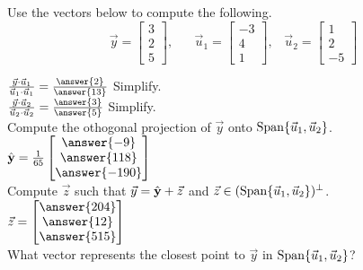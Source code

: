 \documentclass{ximera}
\newcommand{\Span}{\mathop{\rm Span}}
\begin{document}
  	  		             \begin{question} 
  	  		             	Use the vectors below to compute the following. 
  	  		             	$$\vec{y} = \begin{bmatrix} 3\\2\\5\end{bmatrix}, \hspace{20pt} \vec{u}_1 = \begin{bmatrix} -3\\4\\1\end{bmatrix}, \hspace{10pt} \vec{u}_2 = \begin{bmatrix} 1\\2\\-5\end{bmatrix}$$
  	  		             	
  	  		             $\frac{\vec{y}\cdot\vec{u}_1}{\vec{u}_1\cdot\vec{u}_1} =\frac{\answer{2}}{\answer{13}}$ Simplify.\vspace{10pt}\\
  	  		              $\frac{\vec{y}\cdot\vec{u}_2}{\vec{u}_2\cdot\vec{u}_2} =\frac{\answer{3}}{\answer{5}} $ Simplify. \vspace{10pt}\\
  	  		              Compute the othogonal projection of $\vec{y}$ onto $\Span\{\vec{u}_1,\vec{u}_2\}$.\vspace{10pt}\\
  	  		             $	\hat{\bf y} = \frac{1}{65}\begin{bmatrix} \answer{-9}\\\answer{118}\\\answer{-190}\end{bmatrix}$\vspace{10pt}\\
  	  		             Compute $\vec{z}$ such that $\vec{y} = 	\hat{\bf y} +\vec{z}$ and $\vec{z}\in (\Span\{\vec{u}_1,\vec{u}_2\} )^\perp$.\vspace{10pt}\\
  	  		           $\vec{z} = \begin{bmatrix} \answer{204}\\\answer{12}\\\answer{515}\end{bmatrix}$\vspace{10pt}\\
  	  		           
  	  		           What vector represents the closest point to $\vec{y}$ in $\Span\{\vec{u}_1,\vec{u}_2\}$?\\
  	  		           
  	  		           	\begin{multipleChoice}
  	  		           	\end{multipleChoice}
  	  		             \end{question}
  
\end{document}
